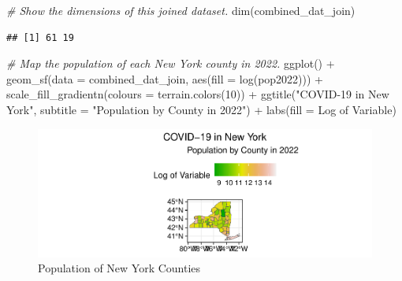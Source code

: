 \documentclass[
  12pt,
]{article}
\newenvironment{Shaded}{\begin{snugshade}}{\end{snugshade}}
\newcommand{\AttributeTok}[1]{\textcolor[rgb]{0.77,0.63,0.00}{#1}}
\newcommand{\CommentTok}[1]{\textcolor[rgb]{0.56,0.35,0.01}{\textit{#1}}}
\newcommand{\DecValTok}[1]{\textcolor[rgb]{0.00,0.00,0.81}{#1}}
\newcommand{\FunctionTok}[1]{\textcolor[rgb]{0.00,0.00,0.00}{#1}}
\newcommand{\NormalTok}[1]{#1}
\newcommand{\SpecialCharTok}[1]{\textcolor[rgb]{0.00,0.00,0.00}{#1}}
\newcommand{\StringTok}[1]{\textcolor[rgb]{0.31,0.60,0.02}{#1}}
\begin{document}
\begin{Shaded}
\begin{Highlighting}[]
\CommentTok{\# Show the dimensions of this joined dataset.}
\FunctionTok{dim}\NormalTok{(combined\_dat\_join)}
\end{Highlighting}
\end{Shaded}

\begin{verbatim}
## [1] 61 19
\end{verbatim}

\begin{Shaded}
\begin{Highlighting}[]
\CommentTok{\# Map the population of each New York county in 2022.}
\FunctionTok{ggplot}\NormalTok{() }\SpecialCharTok{+}
  \FunctionTok{geom\_sf}\NormalTok{(}\AttributeTok{data =}\NormalTok{ combined\_dat\_join, }\FunctionTok{aes}\NormalTok{(}\AttributeTok{fill =} \FunctionTok{log}\NormalTok{(pop2022))) }\SpecialCharTok{+}
  \FunctionTok{scale\_fill\_gradientn}\NormalTok{(}\AttributeTok{colours =} \FunctionTok{terrain.colors}\NormalTok{(}\DecValTok{10}\NormalTok{)) }\SpecialCharTok{+}
  \FunctionTok{ggtitle}\NormalTok{(}\StringTok{"COVID{-}19 in New York"}\NormalTok{,}
          \AttributeTok{subtitle =} \StringTok{"Population by County in 2022"}\NormalTok{) }\SpecialCharTok{+}
  \FunctionTok{labs}\NormalTok{(}\AttributeTok{fill =} \StringTok{\textquotesingle{}Log of Variable\textquotesingle{}}\NormalTok{)}
\end{Highlighting}
\end{Shaded}

\begin{figure}

\includegraphics{EDA_Final_Group_Project_files/figure-latex/unnamed-chunk-15-1} \hfill{}

\caption{Population of New York Counties}\label{fig:unnamed-chunk-15}
\end{figure}
\end{document}
